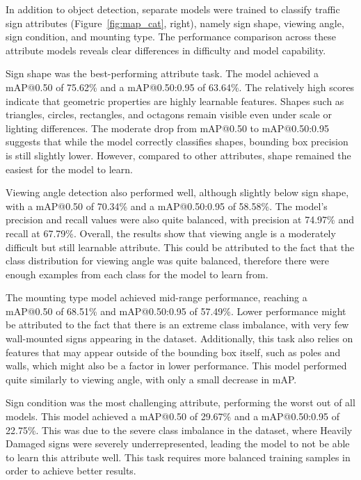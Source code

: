 \documentclass{article}
\begin{document}
In addition to object detection, separate models were trained to classify traffic sign attributes (Figure~\ref{fig:map_cat}, right), namely sign shape, viewing angle, sign condition, and mounting type. The performance comparison across these attribute models reveals clear differences in difficulty and model capability.

Sign shape was the best-performing attribute task. The model achieved a mAP@0.50 of 75.62\% and a mAP@0.50:0.95 of 63.64\%. The relatively high scores indicate that geometric properties are highly learnable features. Shapes such as triangles, circles, rectangles, and octagons remain visible even under scale or lighting differences. The moderate drop from mAP@0.50 to mAP@0.50:0.95 suggests that while the model correctly classifies shapes, bounding box precision is still slightly lower. However, compared to other attributes, shape remained the easiest for the model to learn.

Viewing angle detection also performed well, although slightly below sign shape, with a mAP@0.50 of 70.34\% and a mAP@0.50:0.95 of 58.58\%. The model's precision and recall values were also quite balanced, with precision at 74.97\% and recall at 67.79\%. Overall, the results show that viewing angle is a moderately difficult but still learnable attribute. This could be attributed to the fact that the class distribution for viewing angle was quite balanced, therefore there were enough examples from each class for the model to learn from.

The mounting type model achieved mid-range performance, reaching a mAP@0.50 of 68.51\% and mAP@0.50:0.95 of 57.49\%. Lower performance might be attributed to the fact that there is an extreme class imbalance, with very few wall-mounted signs appearing in the dataset. Additionally, this task also relies on features that may appear outside of the bounding box itself, such as poles and walls, which might also be a factor in lower performance. This model performed quite similarly to viewing angle, with only a small decrease in mAP.

Sign condition was the most challenging attribute, performing the worst out of all models. This model achieved a mAP@0.50 of 29.67\% and a mAP@0.50:0.95 of 22.75\%. This was due to the severe class imbalance in the dataset, where Heavily Damaged signs were severely underrepresented, leading the model to not be able to learn this attribute well. This task requires more balanced training samples in order to achieve better results.
\end{document}
